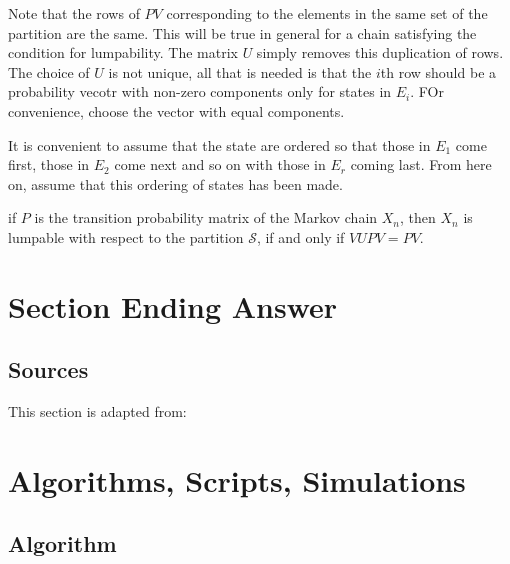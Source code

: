 \documentclass[12pt]{article}
\begin{document}
Note that the rows of $PV$ corresponding to the elements in the same
set of the partition are the same.  This will be true in general for a
chain satisfying the condition for lumpability.  The matrix $U$ simply
removes this duplication of rows.  The choice of $U$ is not unique,
all that is needed is that the $i$th row should be a probability
vecotr with non-zero components only for states in $E_i$.  FOr
convenience, choose the vector with equal components.

It is convenient to assume that the state are ordered so that those
in $E_1$ come first, those in $E_{2}$ come next and so on with those
in $E_r$ coming last.  From here on, assume that this ordering of
states has been made.


\begin{theorem}
  if $P$ is the transition probability matrix of the Markov chain
$X_n$, then $X_n$ is lumpable with respect to the partition $\mathcal{S}$, if and only if
\( VUPV = PV \).
\end{theorem}


\subsection*{}

\section*{Section Ending Answer}

\subsection*{Sources}
This section is adapted from: 

\nocite{}
\nocite{}

\hr

\section*{Algorithms, Scripts, Simulations}

\subsection*{Algorithm}
\end{document}
